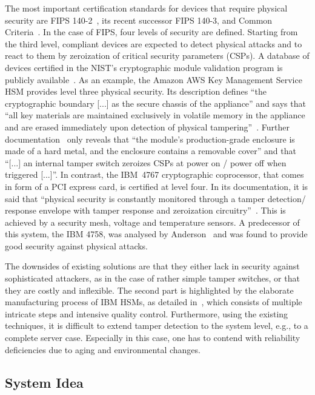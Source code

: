 \documentclass[conference]{IEEEtran}
\begin{document}
The most important certification standards for devices that require physical security are FIPS 140-2~\cite{nistFIPS140_2}, its recent successor FIPS 140-3, and Common Criteria~\cite{commonCriteria}. 
 In the case of FIPS, four levels of security are defined. Starting from the third level, compliant devices are expected to detect physical attacks and to react to them by zeroization of critical security parameters (CSPs). A database of devices certified in the NIST's cryptographic module validation program is publicly available~\cite{nist_cmvp_database}. As an example, the Amazon AWS Key Management Service HSM provides level three physical security. Its description defines ``the cryptographic boundary [...] as the secure chassis of the appliance'' and says that ``all key materials are maintained exclusively in volatile memory in the appliance and are erased immediately upon detection of physical tampering''~\cite{nist_cmvp_aws_hsm}. Further documentation~\cite{nist_cmvp_aws_sec_policy} only reveals that ``the module’s production-grade enclosure is made of a hard metal, and the enclosure contains a removable cover'' and that ``[...] an internal tamper switch zeroizes CSPs at power on / power off when triggered [...]''. In contrast, the IBM~4767 cryptographic coprocessor, that comes in form of a PCI express card, is certified at level four. In its documentation, it is said that ``physical security is constantly monitored through a tamper detection/ response envelope with tamper response and zeroization circuitry''~\cite{nist_cmvp_ibm_sec_policy}. This is achieved by a security mesh, voltage and temperature sensors.  A predecessor of this system, the IBM 4758, was analysed by Anderson~\cite{andersonSecEngineering} and was found to provide good security against physical attacks.

The downsides of existing solutions are that they either lack in security against sophisticated attackers, as in the case of rather simple tamper switches, or that they are costly and inflexible. The second part is highlighted by the elaborate manufacturing process of IBM HSMs, as detailed in~\cite{isaacs2013tamper}, which consists of multiple intricate steps and intensive quality control. Furthermore, using the existing techniques, it is difficult to extend tamper detection to the system level, e.g., to a complete server case. Especially in this case, one has to contend with reliability deficiencies due to aging and environmental changes.




\subsection{System Idea}
\label{sec:system_idea}
\end{document}
